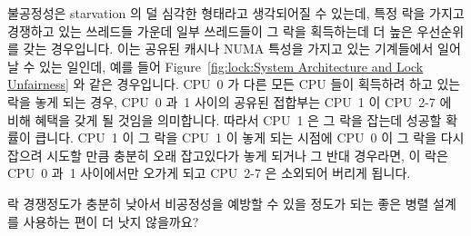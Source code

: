 불공정성은 starvation 의 덜 심각한 형태라고 생각되어질 수 있는데, 특정 락을
가지고 경쟁하고 있는 쓰레드들 가운데 일부 쓰레드들이 그 락을 획득하는데 더 높은
우선순위를 갖는 경우입니다.
이는 공유된 캐시나 NUMA 특성을 가지고 있는 기계들에서 일어날 수 있는 일인데,
예를 들어
Figure~\ref{fig:lock:System Architecture and Lock Unfairness} 와 같은
경우입니다.
CPU~0 가 다른 모든 CPU 들이 획득하려 하고 있는 락을 놓게 되는 경우, CPU~0 과~1
사이의 공유된 접합부는 CPU~1 이 CPU~2-7 에 비해 혜택을 갖게 될 것임을
의미합니다.
따라서 CPU~1 은 그 락을 잡는데 성공할 확률이 큽니다.
CPU~1 이 그 락을 CPU~1 이 놓게 되는 시점에 CPU~0 이 그 락을 다시 잡으려 시도할
만큼 충분히 오래 잡고있다가 놓게 되거나 그 반대 경우라면, 이 락은 CPU~0 과~1
사이에서만 오가게 되고 CPU~2-7 은 소외되어 버리게 됩니다.

\QuickQuiz{}
	락 경쟁정도가 충분히 낮아서 비공정성을 예방할 수 있을 정도가 되는 좋은
	병렬 설계를 사용하는 편이 더 낫지 않을까요?
	\iffalse

